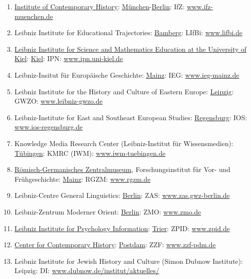 \documentclass{book}
\numberwithin{equation}{section}
\begin{document}
\begin{enumerate}
    \item \href{https://en.wikipedia.org/wiki/Institut_f%C3%BCr_Zeitgeschichte}{Institute of Contemporary History}: \href{https://en.wikipedia.org/wiki/M%C3%BCnchen}{München}-\href{https://en.wikipedia.org/wiki/Berlin}{Berlin}: IfZ: \url{www.ifz-muenchen.de}
    \item Leibniz Institute for Educational Trajectories: \href{https://en.wikipedia.org/wiki/Bamberg}{Bamberg}: LIfBi: \url{www.lifbi.de}
    \item \href{https://en.wikipedia.org/wiki/Leibniz_Institute_for_Science_and_Mathematics_Education_at_the_University_of_Kiel}{Leibniz Institute for Science and Mathematics Education at the University of Kiel}: \href{https://en.wikipedia.org/wiki/Kiel}{Kiel}: IPN: \url{www.ipn.uni-kiel.de}
    \item Leibniz-Insitut für Europäische Geschichte: \href{https://en.wikipedia.org/wiki/Mainz}{Mainz}: IEG: \url{www.ieg-mainz.de}
    \item Leibniz Institute for the History and Culture of Eastern Europe: \href{https://en.wikipedia.org/wiki/Leipzig}{Leipzig}: GWZO: \url{www.leibniz-gwzo.de}
    \item Leibniz-Institute for East and Southeast European Studies: \href{https://en.wikipedia.org/wiki/Regensburg}{Regensburg}: IOS: \url{www.ios-regensburg.de}
    \item Knowledge Media Research Center (Leibniz-Institut für Wissensmedien): \href{https://en.wikipedia.org/wiki/T%C3%BCbingen}{Tübingen}: KMRC (IWM): \url{www.iwm-tuebingen.de}
    \item \href{https://en.wikipedia.org/wiki/R%C3%B6misch-Germanisches_Zentralmuseum}{Römisch-Germanisches Zentralmuseum}, Forschungsinstitut für Vor- und Frühgeschichte: \href{https://en.wikipedia.org/wiki/Mainz}{Mainz}: RGZM: \url{www.rgzm.de}
    \item Leibniz-Centre General Linguistics: \href{https://en.wikipedia.org/wiki/Berlin}{Berlin}: ZAS: \url{www.zas.gwz-berlin.de}
    \item Leibniz-Zentrum Moderner Orient: \href{https://en.wikipedia.org/wiki/Berlin}{Berlin}: ZMO: \url{www.zmo.de}
    \item \href{https://en.wikipedia.org/wiki/Leibniz_Institute_for_Psychology_Information}{Leibniz Institute for Psychology Information}: \href{https://en.wikipedia.org/wiki/Trier}{Trier}: ZPID: \url{www.zpid.de}
    \item \href{https://en.wikipedia.org/wiki/Zentrum_f%C3%BCr_Zeithistorische_Forschung}{Center for Contemporary History}: \href{https://en.wikipedia.org/wiki/Potsdam}{Postdam}: ZZF: \url{www.zzf-pdm.de}
    \item Leibniz Institute for Jewish History and Culture (Simon Dubnow Institute): Leipzig: DI: \url{www.dubnow.de/institut/aktuelles/}
\end{enumerate}
\end{document}
